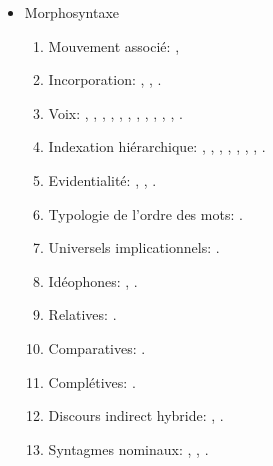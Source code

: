 \documentclass[oneside,a4paper,11pt]{article}
\newcommand{\zh}[1]{{\cn #1}}
\newcommand{\lingua}[3]{#2}%
\begin{document}
\begin{itemize}
\begin{itemize}
\item \lingua{Morphosyntax}{Morphosyntaxe}{形态句法}
\begin{enumerate}
\item \lingua{Associated motion}{Mouvement associé}{关联位移}:
\cite{jacques13harmonization}, \cite{fuente19am}
\item  \lingua{Incorporation}{Incorporation}{名词并入}: \cite{jacques11tangut.verb}, \cite{jacques12demotion}, \cite{jacques12incorp}.
\item  \lingua{Voice}{Voix}{语态}:  \cite{jacques07passif}, \cite{jacques10refl}, \cite{jacques12demotion}, \cite{jacques13derivational.khaling}, \cite{jacques13tropative}, \cite{jacques14antipassive}, \cite{jacques15derivational.khaling}, \cite{jacques15causative},  \cite{jacques15spontaneous},  \cite{jacques16si}, \cite{jacques18generic}, \cite{jacques17volitional}.
\item \lingua{Hierarchical indexation}{Indexation hiérarchique}{人称范畴}:  \cite{jacques10inverse},     \cite{jacques12khaling},   \cite{antonov14rtau}, \cite{jacques14inverse}, \cite{jacques14rtau}, \cite{jacques16th}, \cite{jacques17stau}, \cite{jacques18generic}.
\item \lingua{Evidentiality}{Evidentialité}{示证范畴}: \cite{jacques14auditory}, \cite{jacques18nonpropositional}, \cite{jacques19egophoric}.
\item \lingua{Word-order typology}{Typologie de l'ordre des mots}{语序}: \cite{jacques13harmonization}.
\item \lingua{Implicational universals}{Universels implicationnels}{蕴涵共性}: \cite{antonov14need}.
\item \lingua{Ideophones}{Idéophones}{状貌词}: \cite{japhug14ideophones}, \cite{jacques18ipa}.
\item \lingua{Relativization}{Relatives}{关系句}: \cite{jacques16relatives}.
\item \lingua{Comparative clauses}{Comparatives}{差比句}: \cite{jacques16comparative}.
\item \lingua{Complementation}{Complétives}{补语}: \cite{jacques16complementation}.
\item \lingua{Hybrid indirect speech}{Discours indirect hybride}{混合间接引语}: \cite{jacques16complementation}, \cite{jacques17stau}.
\item \lingua{Noun phrase}{Syntagmes nominaux}{名词组}: \cite{jacques17num}, \cite{jacques17sketch}, \cite{jacques17comitative}.
\end{enumerate}


\end{itemize}
\end{itemize}
\end{document}
